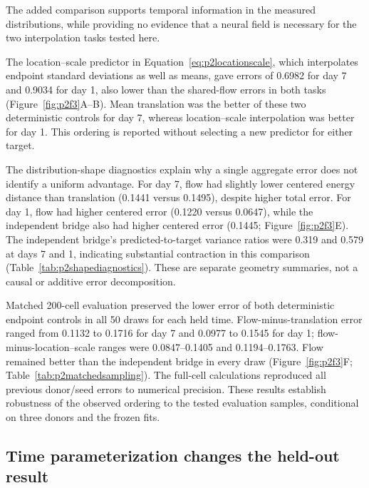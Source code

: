 \documentclass[10pt,a4paper]{article}
\begin{document}
The added comparison supports temporal information in the measured distributions, while providing no evidence that a neural field is necessary for the two interpolation tasks tested here.

The location--scale predictor in Equation~\eqref{eq:p2locationscale}, which interpolates endpoint standard deviations as well as means, gave errors of 0.6982 for day 7 and 0.9034 for day 1, also lower than the shared-flow errors in both tasks (Figure~\ref{fig:p2f3}A--B). Mean translation was the better of these two deterministic controls for day 7, whereas location--scale interpolation was better for day 1. This ordering is reported without selecting a new predictor for either target.

The distribution-shape diagnostics explain why a single aggregate error does not identify a uniform advantage. For day 7, flow had slightly lower centered energy distance than translation (0.1441 versus 0.1495), despite higher total error. For day 1, flow had higher centered error (0.1220 versus 0.0647), while the independent bridge also had higher centered error (0.1445; Figure~\ref{fig:p2f3}E). The independent bridge's predicted-to-target variance ratios were 0.319 and 0.579 at days 7 and 1, indicating substantial contraction in this comparison (Table~\ref{tab:p2shapediagnostics}). These are separate geometry summaries, not a causal or additive error decomposition.

Matched 200-cell evaluation preserved the lower error of both deterministic endpoint controls in all 50 draws for each held time. Flow-minus-translation error ranged from 0.1132 to 0.1716 for day 7 and 0.0977 to 0.1545 for day 1; flow-minus-location--scale ranges were 0.0847--0.1405 and 0.1194--0.1763. Flow remained better than the independent bridge in every draw (Figure~\ref{fig:p2f3}F; Table~\ref{tab:p2matchedsampling}). The full-cell calculations reproduced all previous donor/seed errors to numerical precision. These results establish robustness of the observed ordering to the tested evaluation samples, conditional on three donors and the frozen fits.

\subsection{Time parameterization changes the held-out result}
\end{document}
